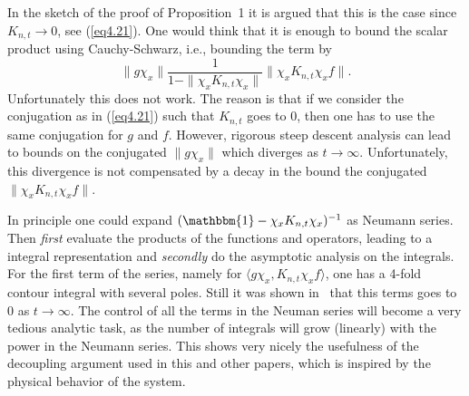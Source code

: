 \documentclass[12pt,a4paper]{article}
\numberwithin{equation}{section}
\newcommand{\Id}{\mathbbm{1}}
\begin{document}
In the sketch of the proof of Proposition~1 it is argued that this is the case since $K_{n,t}\to 0$, see (\ref{eq4.21}). One would think that it is enough to bound the scalar product using Cauchy-Schwarz, i.e., bounding the term by
\begin{equation}
\|g\chi_x\| \frac{1}{1-\|\chi_x K_{n,t} \chi_x\|} \|\chi_x K_{n,t}\chi_x f\|.
\end{equation}
Unfortunately this does not work. The reason is that if we consider the conjugation as in (\ref{eq4.21}) such that $K_{n,t}$ goes to $0$, then one has to use the same conjugation for $g$ and $f$. However, rigorous steep descent analysis can lead to bounds on the conjugated $\|g\chi_x\|$ which diverges as $t\to\infty$. Unfortunately, this divergence is not compensated by a decay in the bound the conjugated $\|\chi_x K_{n,t}\chi_x f\|$.

In principle one could expand $(\Id-\chi_x K_{n,t} \chi_x)^{-1}$ as Neumann series. Then \emph{first} evaluate the products of the functions and operators, leading to a integral representation and \emph{secondly} do the asymptotic analysis on the integrals. For the first term of the series, namely for $\langle g \chi_x, K_{n,t}\chi_x f\rangle$, one has a 4-fold contour integral with several poles. Still it was shown in~\cite{Hin17} that this terms goes to $0$ as $t\to\infty$. The control of all the terms in the Neuman series will become a very tedious analytic task, as the number of integrals will grow (linearly) with the power in the Neumann series. This shows very nicely the usefulness of the decoupling argument used in this and other papers, which is inspired by the physical behavior of the system.
\end{document}
